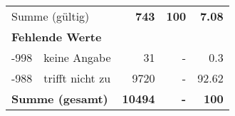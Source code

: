 \begin{longtable}{lXrrr}
     \midrule
     \multicolumn{2}{l}{Summe (gültig)} &
       \textbf{\num{743}} &
     \textbf{100} &
       \textbf{\num[round-mode=places,round-precision=2]{7,08}} \\
     \multicolumn{5}{l}{\textbf{Fehlende Werte}}\\
       -998 &
       keine Angabe &
         \num{31} &
        - &
         \num[round-mode=places,round-precision=2]{0,3} \\
       -988 &
       trifft nicht zu &
         \num{9720} &
        - &
         \num[round-mode=places,round-precision=2]{92,62} \\
     \midrule
     \multicolumn{2}{l}{\textbf{Summe (gesamt)}} &
          \textbf{\num{10494}} &
        \textbf{-} &
        \textbf{100} \\
     \bottomrule
     \end{longtable}
     
